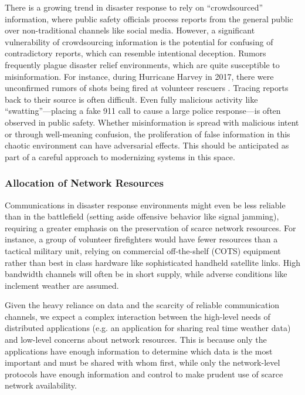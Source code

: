 \documentclass[]             %
{NASA}                       %
\theoremstyle{definition}
\begin{document}
There is a growing trend in disaster response to rely on
``crowdsourced'' information, where public safety officials process
reports from the general public over non-traditional channels like
social media. However, a significant vulnerability of crowdsourcing
information is the potential for confusing of contradictory reports,
which can resemble intentional deception. Rumors frequently plague
disaster relief environments, which are quite susceptible to
misinformation. For instance, during Hurricane Harvey in 2017, there
were unconfirmed rumors of shots being fired at volunteer rescuers
\cite{2017:cajun-navy-rumors}. Tracing reports back to their source is
often difficult. Even fully malicious activity like
``swatting''---placing a fake 911 call to cause a large police
response---is often observed in public safety. Whether misinformation
is spread with malicious intent or through well-meaning confusion, the
proliferation of false information in this chaotic environment can
have adversarial effects. This should be anticipated as part of a
careful approach to modernizing systems in this space.

\subsubsection{Allocation of Network Resources}
\label{sssec:allocation-of-network-resource}
Communications in disaster response environments might even be less
reliable than in the battlefield (setting aside offensive behavior
like signal jamming), requiring a greater emphasis on the preservation
of scarce network resources. For instance, a group of volunteer
firefighters would have fewer resources than a tactical military unit,
relying on commercial off-the-shelf (COTS) equipment rather than best
in class hardware like sophisticated handheld satellite links. High
bandwidth channels will often be in short supply, while adverse
conditions like inclement weather are assumed.

Given the heavy reliance on data and the scarcity of reliable
communication channels, we expect a complex interaction between the
high-level needs of distributed applications (e.g. an application for
sharing real time weather data) and low-level concerns about network
resources. This is because only the applications have enough
information to determine which data is the most important and must be
shared with whom first, while only the network-level protocols have
enough information and control to make prudent use of scarce network
availability.
\end{document}
